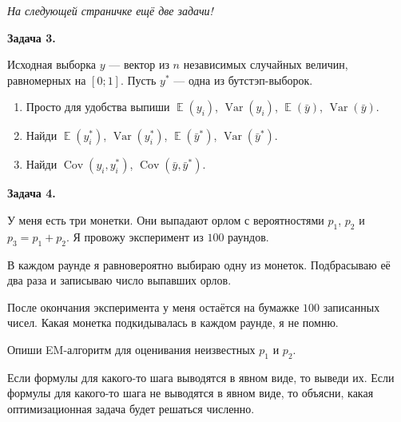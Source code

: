\documentclass[10pt, a4paper]{extarticle}
\DeclareMathOperator{\Var}{Var}
\DeclareMathOperator{\Cov}{Cov}
\DeclareMathOperator{\E}{\mathbb{E}}
\begin{document}
	\textit{На следующей страничке ещё две задачи!}
	
	\newpage

	{\Large \textbf{Задача 3.}}

	Исходная выборка $y$ — вектор из $n$ независимых случайных величин, 
	равномерных на $[0;1]$. Пусть $y^*$ — одна из бутстэп-выборок.
	
	\begin{enumerate}[label = \alph*)]
		\item Просто для удобства выпиши $\E(y_i)$, $\Var(y_i)$, $\E(\bar y)$, $\Var(\bar y)$.
		\item Найди $\E(y^*_i)$, $\Var(y^*_i)$, $\E(\bar y^*)$, $\Var(\bar y^*)$.
		\item Найди $\Cov(y_i, y_i^*)$, $\Cov(\bar y, \bar y^*)$.
	\end{enumerate}
	\vspace{1em}
	
	{\Large \textbf{Задача 4.}}
	
	У меня есть три монетки. 
	Они выпадают орлом с вероятностями $p_1$, $p_2$ и $p_3 = p_1 + p_2$.  
	Я провожу эксперимент из $100$ раундов.
	
	В каждом раунде я равновероятно выбираю одну из монеток. 
	Подбрасываю её два раза и записываю число выпавших орлов. 
	
	После окончания эксперимента у меня остаётся на бумажке $100$ записанных чисел. 
	Какая монетка подкидывалась в каждом раунде, я не помню. 
	
	Опиши EM-алгоритм для оценивания неизвестных $p_1$ и $p_2$.
	
	Если формулы для какого-то шага выводятся в явном виде, то выведи их.
	Если формулы для какого-то шага не выводятся в явном виде, то объясни, 
	какая оптимизационная задача будет решаться численно.
	
\end{document}
